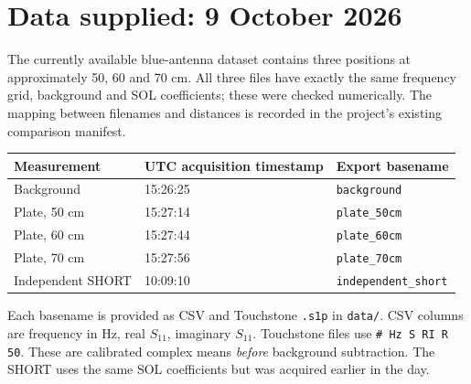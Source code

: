 \documentclass[11pt,a4paper]{article}
\begin{document}
\section{Data supplied: 9 October 2026}
The currently available blue-antenna dataset contains three positions at
approximately 50, 60 and 70 cm. All three files have exactly the same frequency
grid, background and SOL coefficients; these were checked numerically.
The mapping between filenames and distances is recorded in the project's
existing comparison manifest.
\begin{center}
\begin{tabular}{lll}
\toprule
Measurement & UTC acquisition timestamp & Export basename\\
\midrule
Background & 15:26:25 & \texttt{background}\\
Plate, 50 cm & 15:27:14 & \texttt{plate\_50cm}\\
Plate, 60 cm & 15:27:44 & \texttt{plate\_60cm}\\
Plate, 70 cm & 15:27:56 & \texttt{plate\_70cm}\\
Independent SHORT & 10:09:10 & \texttt{independent\_short}\\
\bottomrule
\end{tabular}
\end{center}
Each basename is provided as CSV and Touchstone \texttt{.s1p} in \texttt{data/}.
CSV columns are frequency in Hz, real $S_{11}$, imaginary $S_{11}$.
Touchstone files use \texttt{\# Hz S RI R 50}. These are calibrated complex
means \emph{before} background subtraction. The SHORT uses the same SOL
coefficients but was acquired earlier in the day.

\clearpage
\end{document}
